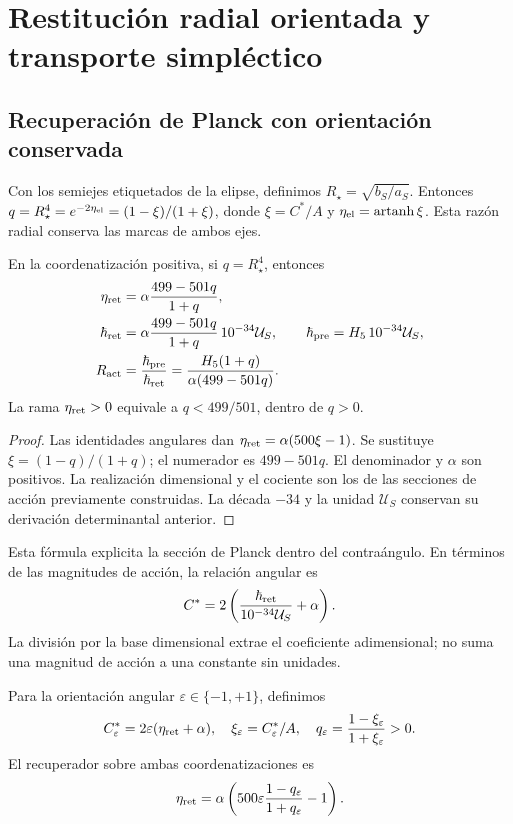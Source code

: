 \section{Restitución radial orientada y transporte simpléctico}
\subsection{Recuperación de Planck con orientación conservada}

Con los semiejes etiquetados de la elipse, definimos
\(R_\star=\sqrt{b_S/a_S}\). Entonces
\(q=R_\star^4=e^{-2\eta_{\rm el}}=(1-\xi)/(1+\xi)\),
donde \(\xi=C^*/A\) y \(\eta_{\rm el}=\operatorname{artanh}\xi\).
Esta razón radial conserva las marcas de ambos ejes.

\begin{theorem}
\label{rec:thm:accion}
En la coordenatización positiva, si \(q=R_\star^4\), entonces
\begin{align}
 \eta_{\rm ret}&=\alpha\frac{499-501q}{1+q},\label{rec:eq:eta-radio}\\
 \hbar_{\rm ret}&=\alpha\frac{499-501q}{1+q}\,10^{-34}\mathcal U_S,
 \qquad\hbar_{\rm pre}=H_5\,10^{-34}\mathcal U_S,\label{rec:eq:planck-radio}\\
 R_{\rm act}&=\frac{\hbar_{\rm pre}}{\hbar_{\rm ret}}
 =\frac{H_5(1+q)}{\alpha(499-501q)}.\label{rec:eq:ratio-radio}
\end{align}
La rama \(\eta_{\rm ret}>0\) equivale a \(q<499/501\), dentro de \(q>0\).
\end{theorem}
\begin{proof}
Las identidades angulares dan \(\eta_{\rm ret}=\alpha(500\xi-1)\). Se sustituye \(\xi=(1-q)/(1+q)\); el numerador es \(499-501q\). El denominador y \(\alpha\) son positivos. La realización dimensional y el cociente son los de las secciones de acción previamente construidas. La década \(-34\) y la unidad \(\mathcal U_S\) conservan su derivación determinantal anterior.
\end{proof}

Esta fórmula explicita la sección de Planck dentro del contraángulo. En términos de las magnitudes de acción, la relación angular es
\[
 C^*=2\left(\frac{\hbar_{\rm ret}}{10^{-34}\mathcal U_S}+\alpha\right).
\]
La división por la base dimensional extrae el coeficiente adimensional; no suma una magnitud de acción a una constante sin unidades.

Para la orientación angular \(\varepsilon\in\{-1,+1\}\), definimos
\[
 C^*_{\varepsilon}=2\varepsilon(\eta_{\rm ret}+\alpha),\quad
 \xi_\varepsilon=C^*_{\varepsilon}/A,\quad
 q_\varepsilon=\frac{1-\xi_\varepsilon}{1+\xi_\varepsilon}>0.
\]
El recuperador sobre ambas coordenatizaciones es
\begin{equation}
 \eta_{\rm ret}=\alpha\left(500\varepsilon
        \frac{1-q_\varepsilon}{1+q_\varepsilon}-1\right).
 \label{rec:eq:eta-orientada}
\end{equation}

